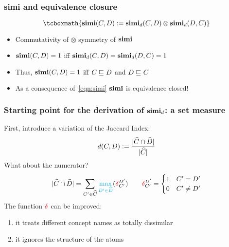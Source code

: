 \documentclass[smaller, dvipsnames]{beamer}
\begin{document}
\begin{frame}
  \frametitle{simi and equivalence closure}
  \begin{equation}
    \label{eqn:simi}
    \tcboxmath{\simi(C,D) := \simi_d(C,D) \otimes \simi_d(D,C)}
  \end{equation}
  \onslide<+->
  \begin{itemize}[<+->]
    \item Commutativity of \(\otimes\) \textrightarrow{} \alert{symmetry} of \(\operatorname{\mathbf{simi}}\)
    \item \(\operatorname{\mathbf{simi}}(C,D) = 1\) iff
          \(\operatorname{\mathbf{simi}}_d(C,D) = \operatorname{\mathbf{simi}}_d(D,C) = 1\)
    \item Thus, \(\operatorname{\mathbf{simi}}(C,D) = 1\) iff \(C \sqsubseteq_{\mathcal{}} D\) and \(D \sqsubseteq_{\mathcal{}} C\)
    \item As a consequence of~\eqref{eqn:simi} \(\operatorname{\mathbf{simi}}\) is \alert{equivalence closed}! 
  \end{itemize}
\end{frame}

\begin{frame}
  \frametitle{Starting point for the derivation of \(\operatorname{\mathbf{simi}}_d\): a set measure}
  First, introduce a variation of the \alert{Jaccard Index}:
  \begin{equation}
    d(C,D) := \frac{\abs{\atom{C} \cap \atom{D}}}%
                   {\abs{\atom{C}}}
  \end{equation}
  \onslide<+->
  What about the numerator?
  \begin{equation}
    \abs{\atom{C} \cap \atom{D}} =
    \sum_{C^\prime \in \atom{C}}%
      \textcolor{cyan}{\max_{D^\prime \in \atom{D}}}%
      (\mydelta_{C^\prime}^{D^\prime})
    \qquad \mydelta_{C^\prime}^{D^\prime}
    = \begin{cases}
      1 & C^\prime = D^\prime \\ 0 & C^\prime \ne D^\prime
    \end{cases}
  \end{equation}
  \onslide<+->
  The function \(\textcolor{red}{\delta}\) can be improved:
  \begin{enumerate}[<+->]
    \item it treats different concept names as totally dissimilar 
    \item it ignores the structure of the atoms
  \end{enumerate}
\end{frame}
\end{document}
